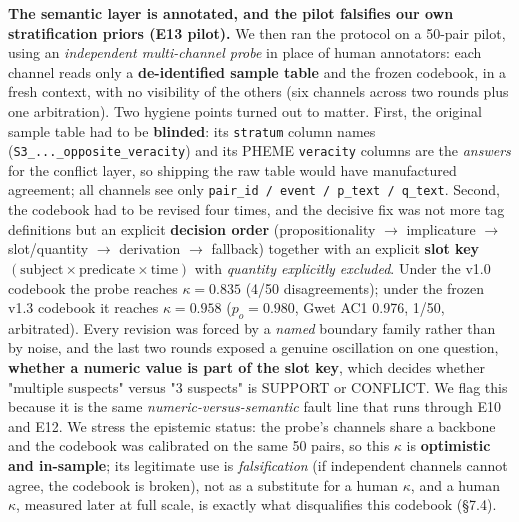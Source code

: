 \textbf{The semantic layer is annotated, and the pilot falsifies our own stratification priors (E13 pilot).} We then ran the protocol on a 50-pair pilot, using an \emph{independent multi-channel probe} in place of human annotators: each channel reads only a \textbf{de-identified sample table} and the frozen codebook, in a fresh context, with no visibility of the others (six channels across two rounds plus one arbitration). Two hygiene points turned out to matter. First, the original sample table had to be \textbf{blinded}: its \texttt{stratum} column names (\texttt{S3\_...\_opposite\_veracity}) and its PHEME \texttt{veracity} columns are the \emph{answers} for the conflict layer, so shipping the raw table would have manufactured agreement; all channels see only \texttt{pair\_id / event / p\_text / q\_text}. Second, the codebook had to be revised four times, and the decisive fix was not more tag definitions but an explicit \textbf{decision order} (propositionality $\to$ implicature $\to$ slot/quantity $\to$ derivation $\to$ fallback) together with an explicit \textbf{slot key} $(\text{subject}\times\text{predicate}\times\text{time})$ with \emph{quantity explicitly excluded}. Under the v1.0 codebook the probe reaches $\kappa=0.835$ (4/50 disagreements); under the frozen v1.3 codebook it reaches $\kappa=\mathbf{0.958}$ ($p_o=0.980$, Gwet AC1 0.976, 1/50, arbitrated). Every revision was forced by a \emph{named} boundary family rather than by noise, and the last two rounds exposed a genuine oscillation on one question, \textbf{whether a numeric value is part of the slot key}, which decides whether "multiple suspects" versus "3 suspects" is SUPPORT or CONFLICT. We flag this because it is the same \emph{numeric-versus-semantic} fault line that runs through E10 and E12. We stress the epistemic status: the probe's channels share a backbone and the codebook was calibrated on the same 50 pairs, so this $\kappa$ is \textbf{optimistic and in-sample}; its legitimate use is \emph{falsification} (if independent channels cannot agree, the codebook is broken), not as a substitute for a human $\kappa$, and a human $\kappa$, measured later at full scale, is exactly what disqualifies this codebook (\S7.4).
